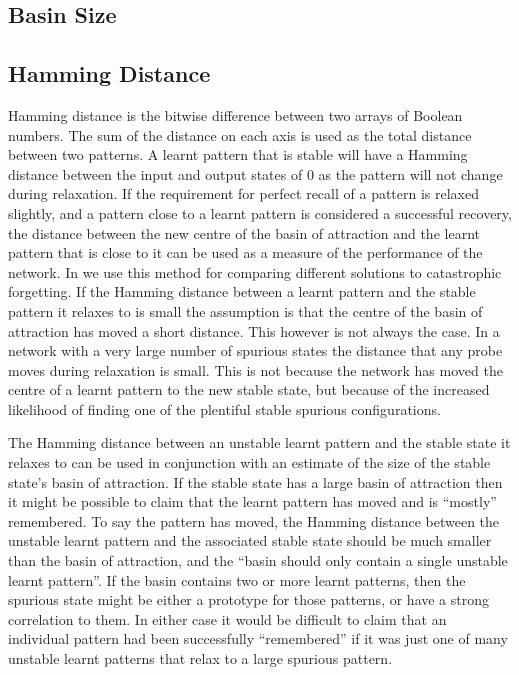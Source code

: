 \subsection{Basin Size}
\label{sec:BasinSize}
            
\subsection{Hamming Distance}
\label{sec:Distmeasure}
Hamming distance is the bitwise difference between two arrays of Boolean numbers.  The sum of the distance on each axis is used as the total distance between two patterns.  A learnt pattern that is stable will have a Hamming distance between the input and output states of 0 as the pattern will not change during relaxation.  If the requirement for perfect recall of a pattern is relaxed slightly, and a pattern close to a learnt pattern is considered a successful recovery, the distance between the new centre of the basin of attraction and the learnt pattern that is close to it can be used as a measure of the performance of the network.  In \citet{Robins1998} we use this method for comparing different solutions to catastrophic forgetting.  If the Hamming distance between a learnt pattern and the stable pattern it relaxes to is small the assumption is that the centre of the basin of attraction has moved a short distance.  This however is not always the case.  In a network with a very large number of spurious states the distance that any probe moves during relaxation is small.  This is not because the network has moved the centre of a learnt pattern to the new stable state,  but because of the increased likelihood of finding one of the plentiful stable spurious configurations.

The Hamming distance between an unstable learnt pattern and the stable state it relaxes to can be used in conjunction with an estimate of the size of the  stable state's basin of attraction.  If the stable state has a large basin of attraction then it might be possible to claim that the learnt pattern has moved and is ``mostly'' remembered.  To say the pattern has moved, the Hamming distance between the unstable learnt pattern and the associated stable state should be much smaller than the basin of attraction, and the ``basin should only contain a single unstable learnt pattern''.  If the basin contains two or more learnt patterns, then the spurious state might be either a prototype for those patterns, or have a strong correlation to them.  In either case it would be difficult to claim that an individual pattern had been successfully ``remembered'' if it was just one of many unstable learnt patterns that relax to a large spurious pattern.

